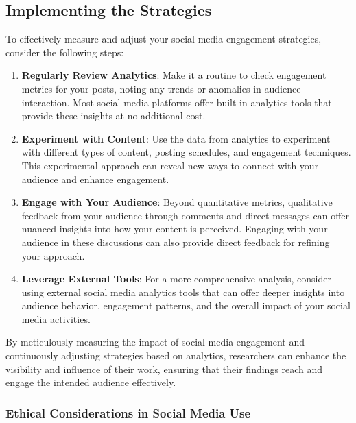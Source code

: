 \documentclass[
]{book}
\begin{document}
\hypertarget{implementing-the-strategies-2}{%
\subsection{Implementing the Strategies}\label{implementing-the-strategies-2}}

To effectively measure and adjust your social media engagement strategies, consider the following steps:

\begin{enumerate}
\def\labelenumi{\arabic{enumi}.}
\item
  \textbf{Regularly Review Analytics}: Make it a routine to check engagement metrics for your posts, noting any trends or anomalies in audience interaction. Most social media platforms offer built-in analytics tools that provide these insights at no additional cost.
\item
  \textbf{Experiment with Content}: Use the data from analytics to experiment with different types of content, posting schedules, and engagement techniques. This experimental approach can reveal new ways to connect with your audience and enhance engagement.
\item
  \textbf{Engage with Your Audience}: Beyond quantitative metrics, qualitative feedback from your audience through comments and direct messages can offer nuanced insights into how your content is perceived. Engaging with your audience in these discussions can also provide direct feedback for refining your approach.
\item
  \textbf{Leverage External Tools}: For a more comprehensive analysis, consider using external social media analytics tools that can offer deeper insights into audience behavior, engagement patterns, and the overall impact of your social media activities.
\end{enumerate}

By meticulously measuring the impact of social media engagement and continuously adjusting strategies based on analytics, researchers can enhance the visibility and influence of their work, ensuring that their findings reach and engage the intended audience effectively.

\hypertarget{ethical-considerations-in-social-media-use}{%
\subsubsection*{Ethical Considerations in Social Media Use}\label{ethical-considerations-in-social-media-use}}
\end{document}
